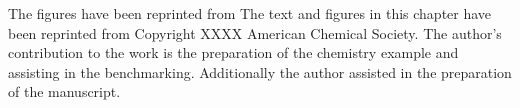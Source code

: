 The figures have been reprinted from %
The text and figures in this chapter have been reprinted from %
Copyright XXXX American Chemical Society. %
The author's contribution to the work is the preparation of the chemistry example and assisting in the benchmarking. Additionally the author assisted in the preparation of the manuscript.
